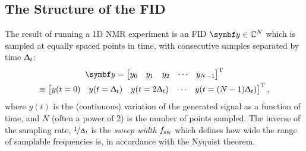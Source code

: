 \subsection{The Structure of the \acs{FID}}
The result of running a \ac{1D} \ac{NMR} experiment is an \ac{FID} $\by \in
\mathbb{C}^N$ which is sampled at equally spaced points in time, with
consecutive samples separated by time $\Updelta_t$:
\begin{equation}
    \begin{gathered}
        \by = \begin{bmatrix}
            y_0 & y_1 & y_2 & \cdots & y_{N-1}
      \end{bmatrix}\T\\
      \equiv
      \begin{bmatrix}
          y(t=0) & y(t=\Dt) & y(t=2\Dt) & \cdots & y(t=(N-1)\Dt)
      \end{bmatrix}\T,
    \end{gathered}
\end{equation}
where $y(t)$ is the (continuous) variation of the generated signal as a
function of time,
and $N$ (often a power of 2) is the number of points sampled. The inverse of
the sampling rate,
$\nicefrac{1}{\Updelta_t}$ is the \emph{sweep width} $f_{\mathrm{sw}}$ which
defines how wide the range of samplable frequencies is, in accordance with the
Nyquist theorem\cite{Shannon1949}.

